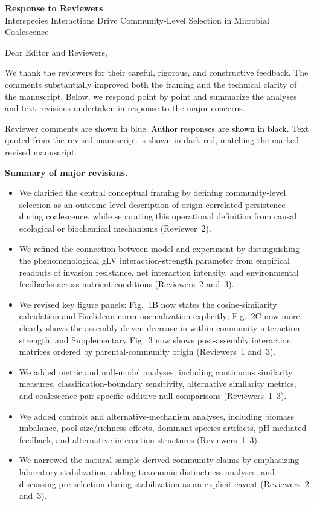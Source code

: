\documentclass[11pt]{article}
\begin{document}
\begin{center}
{\Large \textbf{Response to Reviewers}}\\[0.5em]
{\large Interspecies Interactions Drive Community-Level Selection in Microbial Coalescence}
\end{center}

Dear Editor and Reviewers,

We thank the reviewers for their careful, rigorous, and constructive feedback. The comments substantially improved both the framing and the technical clarity of the manuscript. Below, we respond point by point and summarize the analyses and text revisions undertaken in response to the major concerns.

\textcolor{ReviewerSkyBlue}{Reviewer comments are shown in blue.} \textcolor{black}{Author responses are shown in black.} \textcolor{ManuscriptEditRed}{Text quoted from the revised manuscript is shown in dark red, matching the marked revised manuscript.}

\textbf{Summary of major revisions.}

\begin{itemize}[leftmargin=1.5em,itemsep=0.2em,topsep=0.2em]
\item We clarified the central conceptual framing by defining community-level selection as an outcome-level description of origin-correlated persistence during coalescence, while separating this operational definition from causal ecological or biochemical mechanisms (Reviewer~2).
\item We refined the connection between model and experiment by distinguishing the phenomenological gLV interaction-strength parameter from empirical readouts of invasion resistance, net interaction intensity, and environmental feedbacks across nutrient conditions (Reviewers~2 and~3).
\item We revised key figure panels: Fig.~1B now states the cosine-similarity calculation and Euclidean-norm normalization explicitly; Fig.~2C now more clearly shows the assembly-driven decrease in within-community interaction strength; and Supplementary Fig.~3 now shows post-assembly interaction matrices ordered by parental-community origin (Reviewers~1 and~3).
\item We added metric and null-model analyses, including continuous similarity measures, classification-boundary sensitivity, alternative similarity metrics, and coalescence-pair-specific additive-null comparisons (Reviewers~1--3).
\item We added controls and alternative-mechanism analyses, including biomass imbalance, pool-size/richness effects, dominant-species artifacts, pH-mediated feedback, and alternative interaction structures (Reviewers~1--3).
\item We narrowed the natural sample-derived community claims by emphasizing laboratory stabilization, adding taxonomic-distinctness analyses, and discussing pre-selection during stabilization as an explicit caveat (Reviewers~2 and~3).
\end{itemize}


\clearpage

\clearpage




\end{document}
